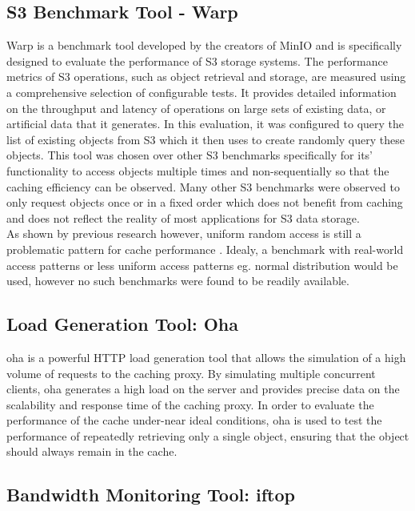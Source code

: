 \subsection{S3 Benchmark Tool - Warp}
\label{warp}
Warp is a benchmark tool developed by the creators of MinIO and is specifically designed to evaluate the performance of S3 storage systems. The performance metrics of S3 operations, such as object retrieval and storage, are measured using a comprehensive selection of configurable tests. It provides detailed information on the throughput and latency of operations on large sets of existing data, or artificial data that it generates.
In this evaluation, it was configured to query the list of existing objects from S3 which it then uses to create randomly query these objects. This tool was chosen over other S3 benchmarks specifically for its' functionality to access objects multiple times and non-sequentially so that the caching efficiency can be  observed. Many other S3 benchmarks were observed to only request objects once or in a fixed order which does not benefit from caching and does not reflect the reality of most applications for S3 data storage.
\\
As shown by previous research however, uniform random access is still a problematic pattern for cache performance \cite{ladner1999cache}. Idealy, a benchmark with real-world access patterns or less uniform access patterns eg. normal distribution would be used, however no such benchmarks were found to be readily available.

\subsection{Load Generation Tool: Oha}
\label{oha}
oha\cite{OHA_GITHUB} is a powerful HTTP load generation tool that allows the simulation of a high volume of requests to the caching proxy. By simulating multiple concurrent clients, oha generates a high load on the server and provides precise data on the scalability and response time of the caching proxy. In order to evaluate the performance of the cache under-near ideal conditions, oha is used to test the performance of repeatedly retrieving only a single object, ensuring that the object should always remain in the cache.

\subsection{Bandwidth Monitoring Tool: iftop}

